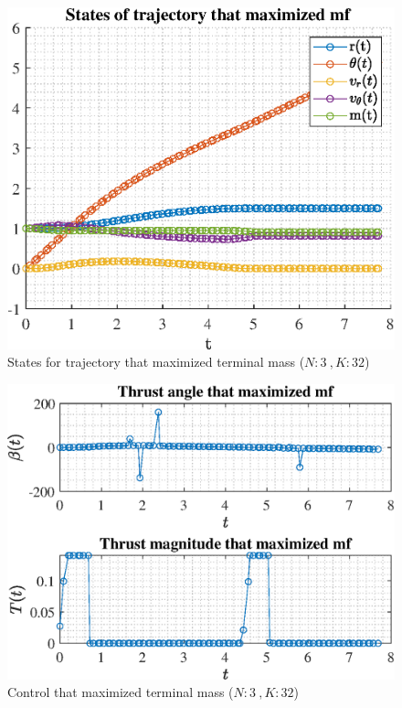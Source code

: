 \documentclass[]{article}
\begin{document}
	\begin{figure}
		\centering
		\includegraphics[scale=0.75]{states_N3_K32_C2_mf.eps}
		\caption{States for trajectory that maximized terminal mass (\(N:3\ , K:32\))}
		\label{fig:states_N3_K32_C2_mf}
	\end{figure}
	\begin{figure}
		\centering
		\includegraphics[scale=0.75]{control_N3_K32_C2_mf.eps}
		\caption{Control that maximized terminal mass (\(N:3\ , K:32\))}
		\label{fig:control_N3_K32_C2_mf}
	\end{figure}
\end{document}
